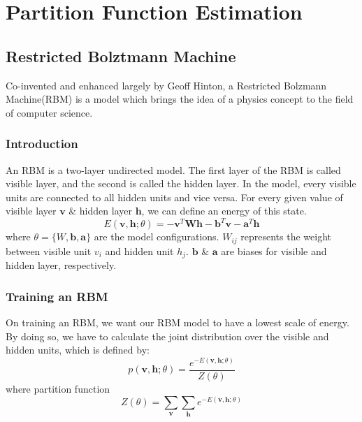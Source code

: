 
\section{Partition Function Estimation} \label{sec:rbm}


\subsection{Restricted Bolztmann Machine}
Co-invented and enhanced largely\cite{hinton2006reducing} by Geoff Hinton, a Restricted Bolzmann Machine(RBM)\cite{mcclelland1987parallel} is a model which brings the idea of a physics concept to the field of computer science.

\subsubsection{Introduction}
An RBM is a two-layer undirected model. The first layer of the RBM is called visible layer, and the second is called the hidden layer. In the model, every visible units are connected to all hidden units and vice versa. For every given value of visible layer $\mathbf v$ \& hidden layer $\mathbf h$, we can define an energy of this state.
\begin{equation}
E(\mathbf v,\mathbf h;\theta)=-\mathbf v^T\mathbf W\mathbf h-\mathbf b^T\mathbf v-\mathbf a^T\mathbf h
\end{equation}
where $\theta =\{W,\mathbf b,\mathbf a\}$ are the model configurations. $W_{ij}$ represents the weight between visible unit $v_{i}$ and hidden unit $h_{j}$. $\mathbf b$ \& $\mathbf a$ are biases for visible and hidden layer, respectively.

\subsubsection{Training an RBM}
On training an RBM, we want our RBM model to have a lowest scale of energy. By doing so, we have to calculate the joint distribution over the visible and hidden units, which is defined by:
\begin{equation}
	p(\mathbf v,\mathbf h;\theta)=\frac{e^{-E(\mathbf v,\mathbf h;\theta)}}{Z(\theta)}
\end{equation}
where partition function
\begin{equation}
	Z(\theta)=\sum_{\mathbf v} \sum_{\mathbf h} e^{-E(\mathbf v,\mathbf h;\theta)}
\end{equation}


